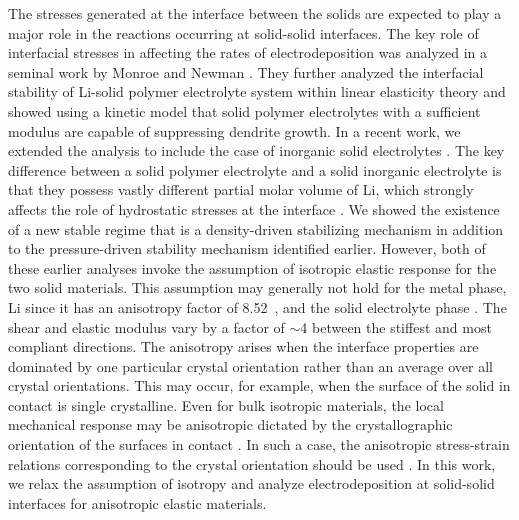 \documentclass[%
reprint,
 amsmath,amssymb,
 aps,
 prb,
]{revtex4-1}
\begin{document}
The stresses generated at the interface between the solids are expected to play a major role in the reactions occurring at solid-solid interfaces. The key role of interfacial stresses in affecting the rates of electrodeposition was analyzed in a seminal work by Monroe and Newman \cite{Monroe2004Effect}.  They further analyzed the interfacial stability of Li-solid polymer electrolyte system within linear elasticity theory and showed using a kinetic model that solid polymer electrolytes with a sufficient modulus are capable of suppressing dendrite growth\cite{Monroe2005Impact}.  In a recent work, we extended the analysis to include the case of inorganic solid electrolytes \cite{ahmad2017stability}.  The key difference between a solid polymer electrolyte and a solid inorganic electrolyte is that they possess vastly different partial molar volume of Li, which strongly affects the role of hydrostatic stresses at the interface \cite{ahmad2017stability}.   We showed the existence of a new stable regime that is a density-driven stabilizing mechanism in addition to the pressure-driven stability mechanism identified earlier.  However, both of these earlier analyses invoke the assumption of isotropic elastic response for the two solid materials. This assumption may generally not hold for the metal phase, Li since it has an anisotropy factor of 8.52~\cite{xuLi2017}, and the solid electrolyte phase \cite{Ahmad16uncertainty}. The shear and elastic modulus vary by a factor of $\sim$4 between the stiffest and most compliant directions. The anisotropy arises when the interface properties are dominated by one particular crystal orientation rather than an average over all crystal orientations. This may occur, for example, when the surface of the solid in contact is single crystalline. Even for bulk isotropic materials, the local mechanical response may be anisotropic dictated by the crystallographic orientation of the surfaces in contact \cite{freund2004thin}. In such a case, the anisotropic stress-strain relations corresponding to the crystal orientation should be used \cite{ting-anis, bower2009mechanics}. In this work, we relax the assumption of isotropy and analyze electrodeposition at solid-solid interfaces for anisotropic elastic materials.
\end{document}
